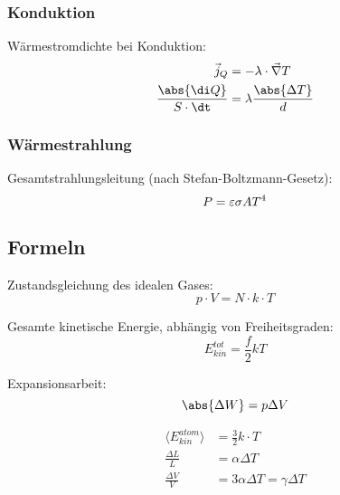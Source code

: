 \documentclass[11pt,letterpaper]{article}
\begin{document}
{{{    \subsubsection{Konduktion}
    {
        Wärmestromdichte bei Konduktion:
        \begin{align*}
            \vec{j}_Q &= -\lambda\cdot \vec{\nabla}T\\
            \frac{\abs{\di Q}}{S\cdot \dt} &= \lambda \frac{\abs{\Delta T}}{d}
        \end{align*}
    }
    \subsubsection{Wärmestrahlung}
    {
        Gesamtstrahlungsleitung (nach Stefan-Boltzmann-Gesetz):
        \begin{equation*}
            P = \varepsilon \sigma A T^4\\
        \end{equation*}
    }
}

 \subsection{Formeln}{

    Zustandsgleichung des idealen Gases:
    \begin{equation*}
        p\cdot V = N\cdot k\cdot T
    \end{equation*}

    Gesamte kinetische Energie, abhängig von Freiheitsgraden:
    \begin{equation*}
        E_{kin}^{tot} = \frac{f}{2} k T
    \end{equation*}

    Expansionsarbeit:
    \begin{equation*}
        \abs{\Delta W} = p\Delta V
    \end{equation*}

    \begin{align*}
        \langle E_{kin}^{atom}\rangle&=\frac{3}{2}k\cdot T \\
        \frac{\Delta L}{L}&=\alpha \Delta T\\
        \frac{\Delta V}{V} &= 3 \alpha \Delta T = \gamma \Delta T\\
    \end{align*}

}}}
\end{document}
